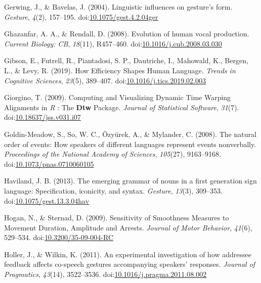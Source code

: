 \documentclass[
  man, noextraspace,floatsintext]{apa6}
\newlength{\cslhangindent}
\newenvironment{cslreferences}%
  {\setlength{\parindent}{0pt}%
  \everypar{\setlength{\hangindent}{\cslhangindent}}\ignorespaces}%
  {\par}
\begin{document}
\begin{cslreferences}
\leavevmode\hypertarget{ref-gerwingLinguisticInfluencesGesture2004}{}%
Gerwing, J., \& Bavelas, J. (2004). Linguistic influences on gesture's form. \emph{Gesture}, \emph{4}(2), 157--195. doi:\href{https://doi.org/10.1075/gest.4.2.04ger}{10.1075/gest.4.2.04ger}

\leavevmode\hypertarget{ref-ghazanfarEvolutionHumanVocal2008}{}%
Ghazanfar, A. A., \& Rendall, D. (2008). Evolution of human vocal production. \emph{Current Biology: CB}, \emph{18}(11), R457--460. doi:\href{https://doi.org/10.1016/j.cub.2008.03.030}{10.1016/j.cub.2008.03.030}

\leavevmode\hypertarget{ref-gibsonHowEfficiencyShapes2019}{}%
Gibson, E., Futrell, R., Piantadosi, S. P., Dautriche, I., Mahowald, K., Bergen, L., \& Levy, R. (2019). How Efficiency Shapes Human Language. \emph{Trends in Cognitive Sciences}, \emph{23}(5), 389--407. doi:\href{https://doi.org/10.1016/j.tics.2019.02.003}{10.1016/j.tics.2019.02.003}

\leavevmode\hypertarget{ref-giorginoComputingVisualizingDynamic2009}{}%
Giorgino, T. (2009). Computing and Visualizing Dynamic Time Warping Alignments in \emph{R} : The \textbf{Dtw} Package. \emph{Journal of Statistical Software}, \emph{31}(7). doi:\href{https://doi.org/10.18637/jss.v031.i07}{10.18637/jss.v031.i07}

\leavevmode\hypertarget{ref-goldin-meadowNaturalOrderEvents2008}{}%
Goldin-Meadow, S., So, W. C., Özyürek, A., \& Mylander, C. (2008). The natural order of events: How speakers of different languages represent events nonverbally. \emph{Proceedings of the National Academy of Sciences}, \emph{105}(27), 9163--9168. doi:\href{https://doi.org/10.1073/pnas.0710060105}{10.1073/pnas.0710060105}

\leavevmode\hypertarget{ref-havilandEmergingGrammarNouns2013}{}%
Haviland, J. B. (2013). The emerging grammar of nouns in a first generation sign language: Specification, iconicity, and syntax. \emph{Gesture}, \emph{13}(3), 309--353. doi:\href{https://doi.org/10.1075/gest.13.3.04hav}{10.1075/gest.13.3.04hav}

\leavevmode\hypertarget{ref-hoganSensitivitySmoothnessMeasures2009}{}%
Hogan, N., \& Sternad, D. (2009). Sensitivity of Smoothness Measures to Movement Duration, Amplitude and Arrests. \emph{Journal of Motor Behavior}, \emph{41}(6), 529--534. doi:\href{https://doi.org/10.3200/35-09-004-RC}{10.3200/35-09-004-RC}

\leavevmode\hypertarget{ref-hollerExperimentalInvestigationHow2011}{}%
Holler, J., \& Wilkin, K. (2011). An experimental investigation of how addressee feedback affects co-speech gestures accompanying speakers' responses. \emph{Journal of Pragmatics}, \emph{43}(14), 3522--3536. doi:\href{https://doi.org/10.1016/j.pragma.2011.08.002}{10.1016/j.pragma.2011.08.002}


\end{cslreferences}
\end{document}
